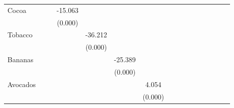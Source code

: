 \begin{table}[htbp]
\begin{tabular}{l*{15}{c}}
Cocoa     &                  &                  &  -15.063\sym{***}&                  &                  &                  &                  &                  &                  &                  &                  &                  &                  &                  &                  \\
          &                  &                  &  (0.000)         &                  &                  &                  &                  &                  &                  &                  &                  &                  &                  &                  &                  \\
Tobacco   &                  &                  &                  &  -36.212\sym{***}&                  &                  &                  &                  &                  &                  &                  &                  &                  &                  &                  \\
          &                  &                  &                  &  (0.000)         &                  &                  &                  &                  &                  &                  &                  &                  &                  &                  &                  \\
Bananas   &                  &                  &                  &                  &  -25.389\sym{***}&                  &                  &                  &                  &                  &                  &                  &                  &                  &                  \\
          &                  &                  &                  &                  &  (0.000)         &                  &                  &                  &                  &                  &                  &                  &                  &                  &                  \\
Avocados  &                  &                  &                  &                  &                  &    4.054\sym{***}&                  &                  &                  &                  &                  &                  &                  &                  &                  \\
          &                  &                  &                  &                  &                  &  (0.000)         &                  &                  &                  &                  &                  &                  &                  &                  &                  \\

\end{tabular}
\end{table}
